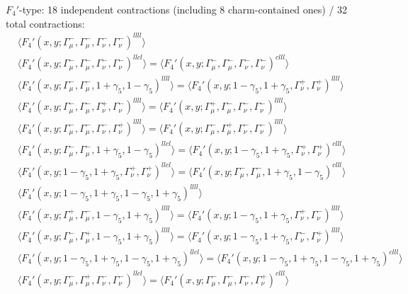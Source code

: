 $F_4'$-type: 18 independent contractions (including 8 charm-contained ones) / 32 total contractions:
\begin{align*}
&\Big\langle F_4'(x,y;\Gamma_\mu^-,\Gamma_\mu^-,\Gamma_\nu^-,\Gamma_\nu^-)^{llll}\Big\rangle\\
&\Big\langle F_4'(x,y;\Gamma_\mu^-,\Gamma_\mu^-,\Gamma_\nu^-,\Gamma_\nu^-)^{llcl}\Big\rangle
=\Big\langle F_4'(x,y;\Gamma_\mu^-,\Gamma_\mu^-,\Gamma_\nu^-,\Gamma_\nu^-)^{clll}\Big\rangle\\
&\Big\langle F_4'(x,y;\Gamma_\mu^-,\Gamma_\mu^-,1+\gamma_5,1-\gamma_5)^{llll}\Big\rangle
=\Big\langle F_4'(x,y;1-\gamma_5,1+\gamma_5,\Gamma_\nu^+,\Gamma_\nu^+)^{llll}\Big\rangle\\
&\Big\langle F_4'(x,y;\Gamma_\mu^-,\Gamma_\mu^-,\Gamma_\nu^+,\Gamma_\nu^-)^{llll}\Big\rangle
=\Big\langle F_4'(x,y;\Gamma_\mu^+,\Gamma_\mu^-,\Gamma_\nu^-,\Gamma_\nu^-)^{llll}\Big\rangle\\
&\Big\langle F_4'(x,y;\Gamma_\mu^-,\Gamma_\mu^-,\Gamma_\nu^-,\Gamma_\nu^+)^{llll}\Big\rangle
=\Big\langle F_4'(x,y;\Gamma_\mu^-,\Gamma_\mu^+,\Gamma_\nu^-,\Gamma_\nu^-)^{llll}\Big\rangle\\
&\Big\langle F_4'(x,y;\Gamma_\mu^-,\Gamma_\mu^-,1+\gamma_5,1-\gamma_5)^{llcl}\Big\rangle
=\Big\langle F_4'(x,y;1-\gamma_5,1+\gamma_5,\Gamma_\nu^+,\Gamma_\nu^+)^{clll}\Big\rangle\\
&\Big\langle F_4'(x,y;1-\gamma_5,1+\gamma_5,\Gamma_\nu^+,\Gamma_\nu^+)^{llcl}\Big\rangle
=\Big\langle F_4'(x,y;\Gamma_\mu^-,\Gamma_\mu^-,1+\gamma_5,1-\gamma_5)^{clll}\Big\rangle\\
&\Big\langle F_4'(x,y;1-\gamma_5,1+\gamma_5,1-\gamma_5,1+\gamma_5)^{llll}\Big\rangle\\
&\Big\langle F_4'(x,y;\Gamma_\mu^+,\Gamma_\mu^-,1-\gamma_5,1+\gamma_5)^{llll}\Big\rangle
=\Big\langle F_4'(x,y;1-\gamma_5,1+\gamma_5,\Gamma_\nu^+,\Gamma_\nu^-)^{llll}\Big\rangle\\
&\Big\langle F_4'(x,y;\Gamma_\mu^-,\Gamma_\mu^+,1-\gamma_5,1+\gamma_5)^{llll}\Big\rangle
=\Big\langle F_4'(x,y;1-\gamma_5,1+\gamma_5,\Gamma_\nu^-,\Gamma_\nu^+)^{llll}\Big\rangle\\
&\Big\langle F_4'(x,y;1-\gamma_5,1+\gamma_5,1-\gamma_5,1+\gamma_5)^{llcl}\Big\rangle
=\Big\langle F_4'(x,y;1-\gamma_5,1+\gamma_5,1-\gamma_5,1+\gamma_5)^{clll}\Big\rangle\\
&\Big\langle F_4'(x,y;\Gamma_\mu^-,\Gamma_\mu^+,\Gamma_\nu^-,\Gamma_\nu^-)^{llcl}\Big\rangle
=\Big\langle F_4'(x,y;\Gamma_\mu^-,\Gamma_\mu^-,\Gamma_\nu^-,\Gamma_\nu^+)^{clll}\Big\rangle\\

\end{align*}
